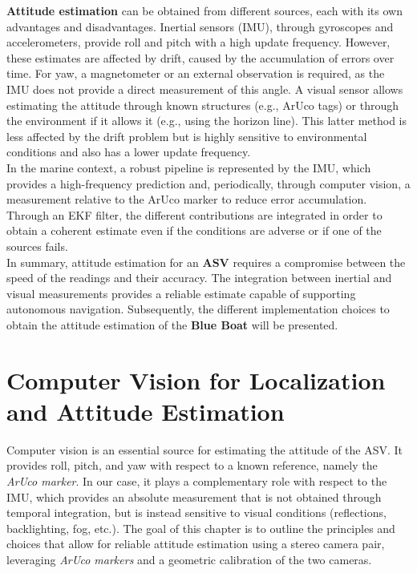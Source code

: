 \textbf{Attitude estimation} can be obtained from different sources, each with its own advantages and disadvantages. Inertial sensors (IMU)\cite{IMU_Euler}, through gyroscopes and accelerometers, provide roll and pitch with a high update frequency. However, these estimates are affected by drift, caused by the accumulation of errors over time. For yaw, a magnetometer or an external observation is required, as the IMU does not provide a direct measurement of this angle. A visual sensor allows estimating the attitude through known structures (e.g., ArUco tags) or through the environment if it allows it (e.g., using the horizon line). This latter method is less affected by the drift problem but is highly sensitive to environmental conditions and also has a lower update frequency.  
\\In the marine context, a robust pipeline is represented by the IMU, which provides a high-frequency prediction and, periodically, through computer vision, a measurement relative to the ArUco marker to reduce error accumulation. Through an EKF filter\cite{EKS_IMU_cv}, the different contributions are integrated in order to obtain a coherent estimate even if the conditions are adverse or if one of the sources fails.  
\\In summary, attitude estimation for an \textbf{ASV} requires a compromise between the speed of the readings and their accuracy. The integration between inertial and visual measurements provides a reliable estimate capable of supporting autonomous navigation. Subsequently, the different implementation choices to obtain the attitude estimation of the \textbf{Blue Boat} will be presented.

\section[Computer Vision and Attitude Estimation]{Computer Vision for Localization and Attitude Estimation}

Computer vision is an essential source for estimating the attitude of the ASV. 
It provides roll, pitch, and yaw with respect to a known reference, namely the \textit{ArUco marker}. 
In our case, it plays a complementary role with respect to the IMU, 
which provides an absolute measurement that is not obtained through temporal integration, 
but is instead sensitive to visual conditions (reflections, backlighting, fog, etc.). 
The goal of this chapter is to outline the principles and choices that allow for reliable 
attitude estimation using a stereo camera pair, leveraging \textit{ArUco markers} 
and a geometric calibration of the two cameras.

